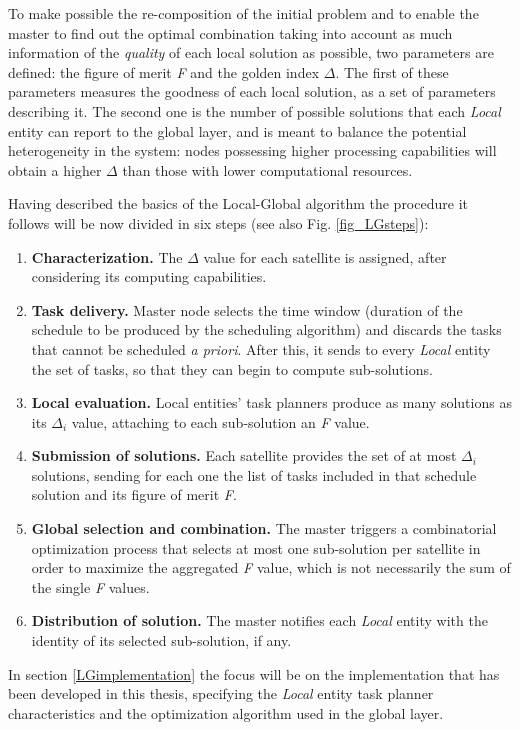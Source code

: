 To make possible the re-composition of the initial problem and to enable the master to find out the optimal combination taking into account as much information of the \emph{quality} of each local solution as possible, two parameters are defined: the figure of merit \emph{F} and the golden index $\Delta$. The first of these parameters measures the goodness of each local solution, as a set of parameters describing it. The second one is the number of possible solutions that each \emph{Local} entity can report to the global layer, and is meant to balance the potential heterogeneity in the system: nodes possessing higher processing capabilities will obtain a higher $\Delta$ than those with lower computational resources.

Having described the basics of the Local-Global algorithm the procedure it follows will be now divided in six steps (see also Fig. \ref{fig_LGsteps}):

\begin{enumerate}
\item \textbf{Characterization.} The $ \Delta $ value for each satellite is assigned, after considering its computing capabilities.
\item \textbf{Task delivery.} Master node selects the time window (duration of the schedule to be produced by the scheduling algorithm) and discards the tasks that cannot be scheduled \emph{a priori}. After this, it sends to every \emph{Local} entity the set of tasks, so that they can begin to compute sub-solutions.
\item \textbf{Local evaluation.} Local entities' task planners produce as many solutions as its $ \Delta_i $ value, attaching to each sub-solution an \emph{F} value.
\item \textbf{Submission of solutions.} Each satellite provides the set of at most $ \Delta_i $ solutions, sending for each one the list of tasks included in that schedule solution and its figure of merit \emph{F}.
\item \textbf{Global selection and combination.} The master triggers a combinatorial optimization process that selects at most one sub-solution per satellite in order to maximize the aggregated \emph{F} value, which is not necessarily the sum of the single \emph{F} values.
\item \textbf{Distribution of solution.} The master notifies each \emph{Local} entity with the identity of its selected sub-solution, if any.
\end{enumerate}

In section \ref{LGimplementation} the focus will be on the implementation that has been developed in this thesis, specifying the \emph{Local} entity task planner characteristics and the optimization algorithm used in the global layer.